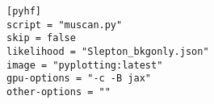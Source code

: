 \documentclass{article}
\newcommand{\toml}{\textsc{toml}}
\begin{document}
\begin{listing}[H]
	\begin{verbatim}
[pyhf]
script = "muscan.py"
skip = false
likelihood = "Slepton_bkgonly.json"
image = "pyplotting:latest"
gpu-options = "-c -B jax"
other-options = ""
  \end{verbatim}
	\caption{The \texttt{pyhf} block of an example \toml{} configuration file for generating slepton events.}
	\label{slepton-config-pyhf}
\end{listing}
\end{document}
